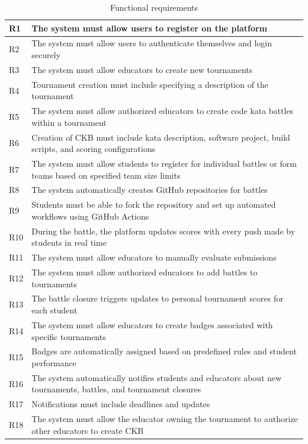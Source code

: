 \begin{table}[H]
    \centering
    \begin{tabular}{|p{0.7cm}|p{15cm}|}
    \hline
        R1 & The system must allow users to register on the platform\\
    \hline
        R2 & The system must allow users to authenticate themselves and login securely\\
    \hline
        R3 & The system must allow educators to create new tournaments\\
    \hline
        R4 & Tournament creation must include specifying a description of the tournament\\
    \hline
        R5 & The system must allow authorized educators to create code kata battles within a tournament\\
    \hline
        R6 & Creation of CKB must include kata description, software project, build scripts, and scoring configurations\\
    \hline
        R7 & The system must allow students to register for individual battles or form teams based on specified team size limits\\
    \hline
        R8 & The system automatically creates GitHub repositories for battles \\
    \hline
        R9 & Students must be able to fork the repository and set up automated workflows using GitHub Actions\\
    \hline
        R10 & During the battle, the platform updates scores with every push made by students in real time\\
    \hline
        R11 & The system must allow educators to manually evaluate submissions\\
        \hline
        R12 & The system must allow authorized educators to add battles to tournaments\\
    \hline
        R13 & The battle closure triggers updates to personal tournament scores for each student\\
    \hline
        R14 & The system must allow educators to create badges associated with specific tournaments\\
    \hline
        R15 & Badges are automatically assigned based on predefined rules and student performance\\
    \hline
        R16 & The system automatically notifies students and educators about new tournaments, battles, and tournament closures\\
    \hline
        R17 & Notifications must include deadlines and updates\\
    \hline
        R18 & The system must allow the educator owning the tournament to authorize other educators to create CKB \\
    \hline
    \end{tabular}
    \caption{Functional requirements}
    \label{tab:requirements}
\end{table}


